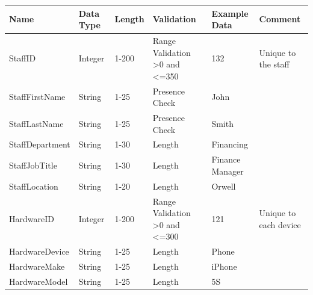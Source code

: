 \begin{center}
\begin{tabular}{|p{4cm}|p{1.3cm}|p{1.1cm}|p{1.7cm}|p{1.7cm}|p{2cm}|}
\hline
\textbf{Name} & \textbf{Data Type}& \textbf{Length} & \textbf{Validation} & \textbf{Example Data} & \textbf{Comment}      \\ \hline
StaffID                             & Integer                                 & 1-200                     & Range Validation \textgreater0 and \textless=350                                 & 132                   & Unique to the staff   \\ \hline
StaffFirstName                      & String                                  & 1-25                                 & Presence Check                           & John                  &                       \\ \hline
StaffLastName                       & String                                  & 1-25                                 & Presence Check                           & Smith                 &                       \\ \hline
StaffDepartment                     & String                                  & 1-30                                 & Length                                   & Financing             &                       \\ \hline
StaffJobTitle			& String				& 1-30			& Length			& Finance Manager		&		\\ \hline
StaffLocation                       & String                                  & 1-20                                 & Length                                   & Orwell                &                       \\ \hline
HardwareID                          & Integer                                 & 1-200                                & Range Validation \textgreater0 and  \textless=300                      & 121                   & Unique to each device \\ \hline
HardwareDevice                      & String                                  & 1-25                                 & Length                                   & Phone                 &                       \\ \hline
HardwareMake                        & String                                  & 1-25                                 & Length                                   & iPhone                &                       \\ \hline
HardwareModel                       & String                                  & 1-25                                 & Length                                   & 5S                    &                       \\ \hline

\end{tabular}
\end{center}

